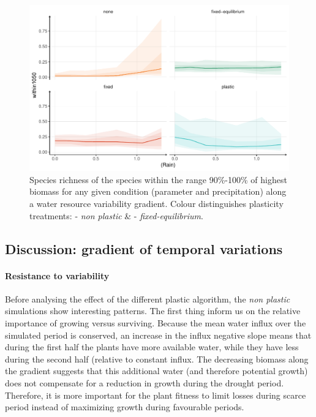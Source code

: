 \begin{figure}\label{fig:variable}
\includegraphics[width = \textwidth]{./2_PP/Figures/Variable/var_spdiv_trend.pdf}
\caption[Species richness of the best performing species along a water resource variability gradient]{Species richness of the species within the range 90\%-100\% of highest biomass for any given condition (parameter and precipitation) along a water resource variability gradient.  Colour distinguishes plasticity treatments: \textcolor{myOrange}{- \textit{non plastic}} \&  \textcolor{myGreen}{- \textit{fixed-equilibrium}}.}
\end{figure}






\subsection{Discussion: gradient of temporal variations}

\paragraph{Resistance to variability}

Before analysing the effect of the different plastic algorithm, the \textit{non plastic} simulations show interesting patterns. The first thing inform us on the relative importance of growing versus surviving. Because the mean water influx over the simulated period is conserved, an increase in the influx negative slope means that during the first half the plants have more available water, while they have less during the second half (relative to constant influx. The decreasing biomass along the gradient suggests that this additional water (and therefore potential growth) does not compensate for a reduction in growth during the drought period. Therefore, it is more important for the plant fitness to limit losses during scarce period instead of maximizing growth during favourable periods. 

